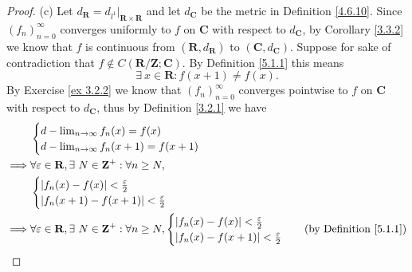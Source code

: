 \begin{proof}{(c)}
    Let \(d_{\mathbf{R}} = d_{l^1}|_{\mathbf{R} \times \mathbf{R}}\) and let \(d_{\mathbf{C}}\) be the metric in Definition \ref{4.6.10}.
    Since \((f_n)_{n = 0}^\infty\) converges uniformly to \(f\) on \(\mathbf{C}\) with respect to \(d_{\mathbf{C}}\), by Corollary \ref{3.3.2} we know that \(f\) is continuous from \((\mathbf{R}, d_{\mathbf{R}})\) to \((\mathbf{C}, d_{\mathbf{C}})\).
    Suppose for sake of contradiction that \(f \notin C(\mathbf{R} / \mathbf{Z} ; \mathbf{C})\).
    By Definition \ref{5.1.1} this means
    \[
        \exists\ x \in \mathbf{R} : f(x + 1) \neq f(x).
    \]
    By Exercise \ref{ex 3.2.2} we know that \((f_n)_{n = 0}^\infty\) converges pointwise to \(f\) on \(\mathbf{C}\) with respect to \(d_{\mathbf{C}}\), thus by Definition \ref{3.2.1} we have
    \begin{align*}
                 & \begin{cases}
                       d - \lim_{n \to \infty} f_n(x) = f(x) \\
                       d - \lim_{n \to \infty} f_n(x + 1) = f(x + 1)
                   \end{cases}                                                                                         \\
        \implies & \forall \varepsilon \in \mathbf{R}, \exists\ N \in \mathbf{Z}^+ : \forall n \geq N,                                                  \\
                 & \begin{cases}
                       \abs*{f_n(x) - f(x)} < \frac{\varepsilon}{2} \\
                       \abs*{f_n(x + 1) - f(x + 1)} < \frac{\varepsilon}{2}
                   \end{cases}                                                                                  \\
        \implies & \forall \varepsilon \in \mathbf{R}, \exists\ N \in \mathbf{Z}^+ : \forall n \geq N, \begin{cases}
                                                                                                           \abs*{f_n(x) - f(x)} < \frac{\varepsilon}{2} \\
                                                                                                           \abs*{f_n(x) - f(x + 1)} < \frac{\varepsilon}{2}
                                                                                                       \end{cases} & \text{(by Definition \ref{5.1.1})} \\

\end{align*}
\end{proof}
